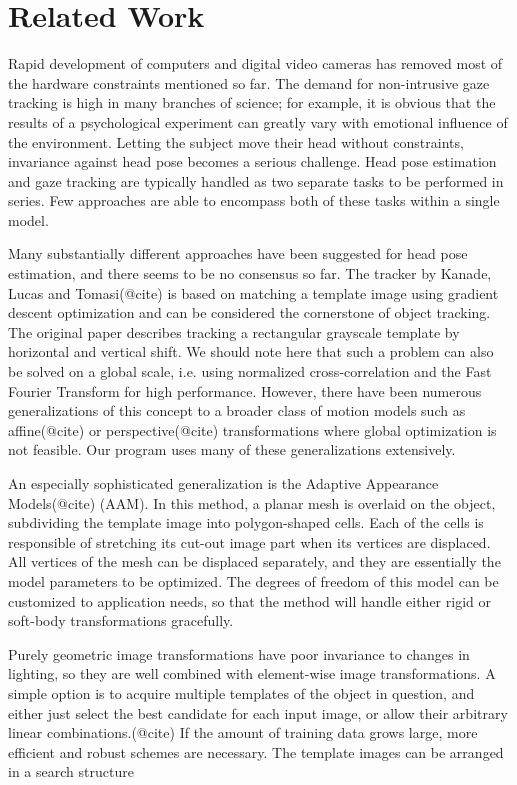 \section{Related Work}

Rapid development of computers and digital video cameras has removed most of the hardware constraints mentioned so far.
The demand for non-intrusive gaze tracking is high in many branches of science; for example, it is obvious that the results of a psychological experiment can greatly vary with emotional influence of the environment.
Letting the subject move their head without constraints, invariance against head pose becomes a serious challenge.
Head pose estimation and gaze tracking are typically handled as two separate tasks to be performed in series.
Few approaches are able to encompass both of these tasks within a single model.

Many substantially different approaches have been suggested for head pose estimation, and there seems to be no consensus so far.
The tracker by Kanade, Lucas and Tomasi(@cite) is based on matching a template image using gradient descent optimization and can be considered the cornerstone of object tracking.
The original paper describes tracking a rectangular grayscale template by horizontal and vertical shift.
We should note here that such a problem can also be solved on a global scale, i.e. using normalized cross-correlation and the Fast Fourier Transform for high performance.
However, there have been numerous generalizations of this concept to a broader class of motion models such as affine(@cite) or perspective(@cite) transformations where global optimization is not feasible.
Our program uses many of these generalizations extensively.

An especially sophisticated generalization is the Adaptive Appearance Models(@cite) (AAM).
In this method, a planar mesh is overlaid on the object, subdividing the template image into polygon-shaped cells.
Each of the cells is responsible of stretching its cut-out image part when its vertices are displaced.
All vertices of the mesh can be displaced separately, and they are essentially the model parameters to be optimized.
The degrees of freedom of this model can be customized to application needs, so that the method will handle either rigid or soft-body transformations gracefully.

Purely geometric image transformations have poor invariance to changes in lighting, so they are well combined with element-wise image transformations.
A simple option is to acquire multiple templates of the object in question, and either just select the best candidate for each input image, or allow their arbitrary linear combinations.(@cite)
If the amount of training data grows large, more efficient and robust schemes are necessary.
The template images can be arranged in a search structure \todo{\dots}

